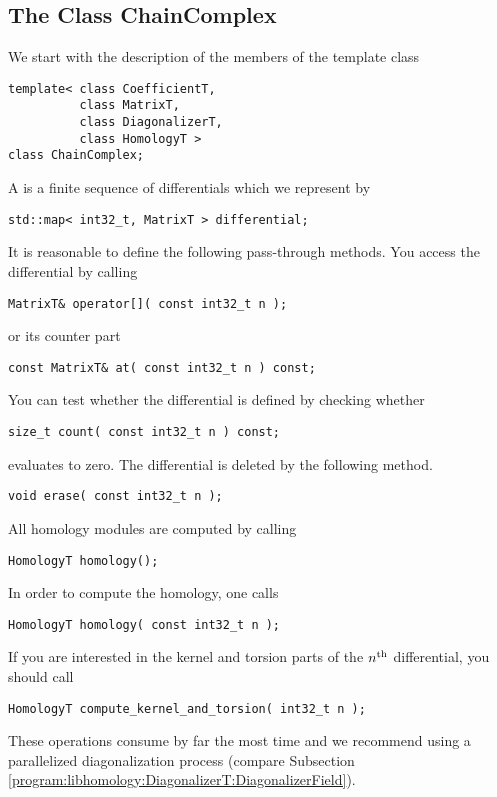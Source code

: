 \subsection{The Class ChainComplex}
\label{program:libhomology:ChainComplex}

We start with the description of the members of the template class
\begin{lstlisting}
template< class CoefficientT,
          class MatrixT,
          class DiagonalizerT,
          class HomologyT >
class ChainComplex;
\end{lstlisting}
A  is a finite sequence of differentials which we represent by
\begin{lstlisting}
std::map< int32_t, MatrixT > differential;
\end{lstlisting}
It is reasonable to define the following pass-through methods.
You access the \nth differential by calling
\begin{lstlisting}
MatrixT& operator[]( const int32_t n );
\end{lstlisting}
or its  counter part
\begin{lstlisting}
const MatrixT& at( const int32_t n ) const;
\end{lstlisting}
You can test whether the \nth differential is defined by checking whether
\begin{lstlisting}
size_t count( const int32_t n ) const;
\end{lstlisting}
evaluates to zero.
The \nth differential is deleted by the following method.
\begin{lstlisting}
void erase( const int32_t n );
\end{lstlisting}
All homology modules are computed by calling
\begin{lstlisting}
HomologyT homology();
\end{lstlisting}
In order to compute the \nth homology, one calls
\begin{lstlisting}
HomologyT homology( const int32_t n );
\end{lstlisting}
If you are interested in the kernel and torsion parts of the $n^{\text{th}}$ differential, you should call
\begin{lstlisting}
HomologyT compute_kernel_and_torsion( int32_t n );
\end{lstlisting}
These operations consume by far the most time and 
we recommend using a parallelized diagonalization process (compare Subsection \ref{program:libhomology:DiagonalizerT:DiagonalizerField}).

